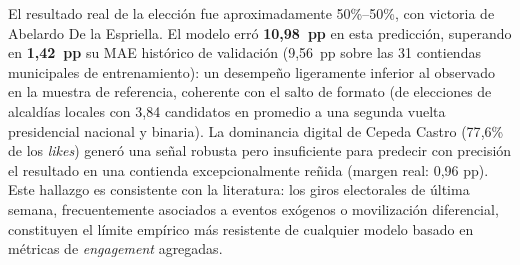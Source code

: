 El resultado real de la elección fue aproximadamente 50\%--50\%, con victoria de Abelardo De la Espriella. El modelo erró \textbf{10{,}98~pp} en esta predicción, superando en \textbf{1{,}42~pp} su MAE histórico de validación (9{,}56~pp sobre las 31 contiendas municipales de entrenamiento): un desempeño ligeramente inferior al observado en la muestra de referencia, coherente con el salto de formato (de elecciones de alcaldías locales con 3{,}84 candidatos en promedio a una segunda vuelta presidencial nacional y binaria). La dominancia digital de Cepeda Castro (77{,}6\% de los \textit{likes}) generó una señal robusta pero insuficiente para predecir con precisión el resultado en una contienda excepcionalmente reñida (margen real: 0{,}96 pp). Este hallazgo es consistente con la literatura: los giros electorales de última semana, frecuentemente asociados a eventos exógenos o movilización diferencial, constituyen el límite empírico más resistente de cualquier modelo basado en métricas de \textit{engagement} agregadas.

